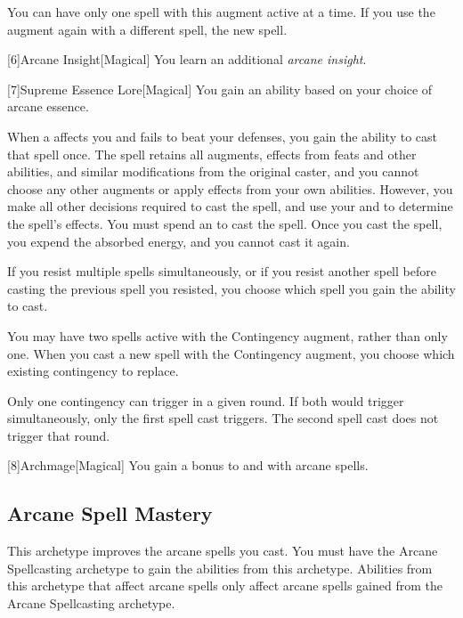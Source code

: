         You can have only one spell with this augment active at a time.
        If you use the augment again with a different spell, the new spell.

        [6]{Arcane Insight}[Magical]
        You learn an additional \textit{arcane insight}.

        [7]{Supreme Essence Lore}[Magical]
        You gain an ability based on your choice of arcane essence.

         When a  affects you and fails to beat your defenses, you gain the ability to cast that spell once.
        The spell retains all augments, effects from feats and other abilities, and similar modifications from the original caster, and you cannot choose any other augments or apply effects from your own abilities.
        However, you make all other decisions required to cast the spell, and use your  and  to determine the spell's effects.
        You must spend an  to cast the spell.
        Once you cast the spell, you expend the absorbed energy, and you cannot cast it again.

        If you resist multiple spells simultaneously, or if you resist another spell before casting the previous spell you resisted, you choose which spell you gain the ability to cast.

         You may have two spells active with the Contingency augment, rather than only one.
        When you cast a new spell with the Contingency augment, you choose which existing contingency to replace.

        Only one contingency can trigger in a given round.
        If both would trigger simultaneously, only the first spell cast triggers.
        The second spell cast does not trigger that round.

        [8]{Archmage}[Magical]
        You gain a  bonus to  and  with arcane spells.

    \subsection{Arcane Spell Mastery}
        This archetype improves the arcane spells you cast.
        You must have the Arcane Spellcasting archetype to gain the abilities from this archetype.
        Abilities from this archetype that affect arcane spells only affect arcane spells gained from the Arcane Spellcasting archetype.

